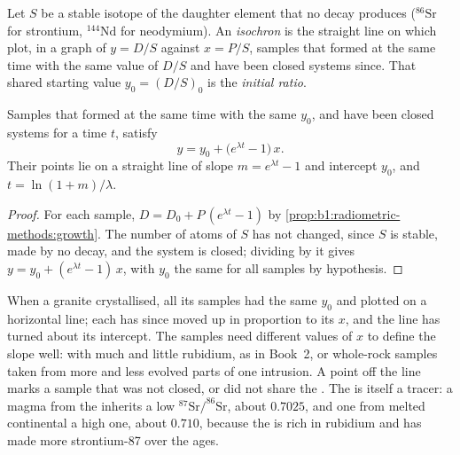 \begin{definition}\label{def:b1:radiometric-methods:isochron}
Let $S$ be a stable isotope of the daughter element that no decay produces
($^{86}\mathrm{Sr}$ for strontium, $^{144}\mathrm{Nd}$ for neodymium). An
\emph{isochron} is the straight line on which plot, in a graph
of $y = D/S$ against $x = P/S$, samples that formed at the same time with the
same value of $D/S$ and have been closed systems since. That shared starting
value $y_0 = (D/S)_0$ is the \emph{initial ratio}.
\end{definition}

\begin{theorem}\label{thm:b1:radiometric-methods:isochron}
Samples that formed at the same time with the same  $y_0$, and have
been closed systems for a time $t$, satisfy
\[
  y = y_0 + \bigl(e^{\lambda t} - 1\bigr)\,x .
\]
Their points lie on a straight line of slope $m = e^{\lambda t} - 1$ and
intercept $y_0$, and $t = \ln(1+m)/\lambda$.
\end{theorem}

\begin{proof}
For each sample, $D = D_0 + P\,(e^{\lambda t} - 1)$ by
\cref{prop:b1:radiometric-methods:growth}. The number of atoms of $S$ has not
changed, since $S$ is stable, made by no decay, and the system is closed;
dividing by it gives $y = y_0 + (e^{\lambda t} - 1)\,x$, with $y_0$ the same for
all samples by hypothesis.
\end{proof}

When a granite crystallised, all its samples had the same $y_0$ and plotted on a
horizontal line; each has since moved up in proportion to its $x$, and the line
has turned about its intercept. The samples need different values of $x$ to
define the slope well:  with much and little rubidium, as in Book~2, or
whole-rock samples taken from more and less evolved parts of one intrusion. A
point off the line marks a sample that was not closed, or did not share the
. The  is itself a tracer: a magma from the 
inherits a low $^{87}\mathrm{Sr}/^{86}\mathrm{Sr}$, about $0.7025$, and one from
melted continental  a high one, about $0.710$, because the  is rich in
rubidium and has made more strontium-87 over the ages.


